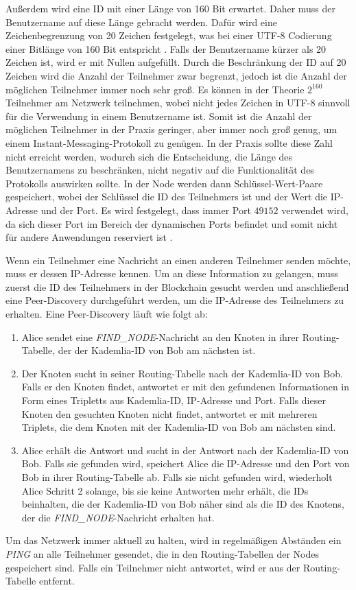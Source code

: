 Außerdem wird eine ID mit einer Länge von 160 Bit erwartet. Daher muss der Benutzername auf diese Länge gebracht werden. Dafür wird eine Zeichenbegrenzung von 20 Zeichen festgelegt, was bei einer UTF-8 Codierung einer Bitlänge von 160 Bit entspricht \parencite{rfc3629_utf-8}. Falls der Benutzername kürzer als 20 Zeichen ist, wird er mit Nullen aufgefüllt. Durch die Beschränkung der ID auf 20 Zeichen wird die Anzahl der Teilnehmer zwar begrenzt, jedoch ist die Anzahl der möglichen Teilnehmer immer noch sehr groß. Es können in der Theorie $2^{160}$ Teilnehmer am Netzwerk teilnehmen, wobei nicht jedes Zeichen in UTF-8 sinnvoll für die Verwendung in einem Benutzername ist. Somit ist die Anzahl der möglichen Teilnehmer in der Praxis geringer, aber immer noch groß genug, um einem Instant-Messaging-Protokoll zu genügen. In der Praxis sollte diese Zahl nicht erreicht werden, wodurch sich die Entscheidung, die Länge des Benutzernamens zu beschränken, nicht negativ auf die Funktionalität des Protokolls auswirken sollte.
In der Node werden dann Schlüssel-Wert-Paare gespeichert, wobei der Schlüssel die ID des Teilnehmers ist und der Wert die IP-Adresse und der Port. Es wird festgelegt, dass immer Port $49152$ verwendet wird, da sich dieser Port im Bereich der dynamischen Ports befindet und somit nicht für andere Anwendungen reserviert ist \parencite[S. 20]{rfc6335_IANA_Ports}. 

Wenn ein Teilnehmer eine Nachricht an einen anderen Teilnehmer senden möchte, muss er dessen IP-Adresse kennen. Um an diese Information zu gelangen, muss zuerst die ID des Teilnehmers in der Blockchain gesucht werden und anschließend eine Peer-Discovery durchgeführt werden, um die IP-Adresse des Teilnehmers zu erhalten. Eine Peer-Discovery läuft wie folgt ab:

\begin{enumerate}
    \item Alice sendet eine \textit{FIND\_NODE}-Nachricht an den Knoten in ihrer Routing-Tabelle, der der Kademlia-ID von Bob am nächsten ist. 
    \item Der Knoten sucht in seiner Routing-Tabelle nach der Kademlia-ID von Bob. Falls er den Knoten findet, antwortet er mit den gefundenen Informationen in Form eines Tripletts aus Kademlia-ID, IP-Adresse und Port. Falls dieser Knoten den gesuchten Knoten nicht findet, antwortet er mit mehreren Triplets, die dem Knoten mit der Kademlia-ID von Bob am nächsten sind.
    \item Alice erhält die Antwort und sucht in der Antwort nach der Kademlia-ID von Bob. Falls sie gefunden wird, speichert Alice die IP-Adresse und den Port von Bob in ihrer Routing-Tabelle ab. Falls sie nicht gefunden wird, wiederholt Alice Schritt 2 solange, bis sie keine Antworten mehr erhält, die IDs beinhalten, die der Kademlia-ID von Bob näher sind als die ID des Knotens, der die \textit{FIND\_NODE}-Nachricht erhalten hat.
\end{enumerate}

\noindent Um das Netzwerk immer aktuell zu halten, wird in regelmäßigen Abständen ein \textit{PING} an alle Teilnehmer gesendet, die in den Routing-Tabellen der Nodes gespeichert sind. Falls ein Teilnehmer nicht antwortet, wird er aus der Routing-Tabelle entfernt.
